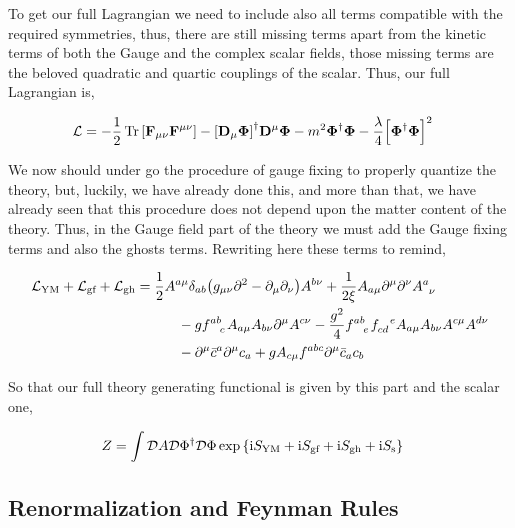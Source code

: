 To get our full Lagrangian we need to include also all terms compatible with the required symmetries, 
thus, there are still missing terms apart from the kinetic terms of both the Gauge and the complex scalar 
fields, those missing terms are the beloved quadratic and quartic couplings of the scalar. Thus,
our full Lagrangian is,

\begin{align}
    \mathcal L&=-\frac12\Tr\qty[\vb F_{\mu\nu}\vb F^{\mu\nu}]-\qty[\vb D_\mu\boldsymbol\Phi]^\dagger
    \vb D^\mu\boldsymbol\Phi-m^2\boldsymbol\Phi^\dagger\boldsymbol\Phi-\frac{\lambda}{4}\qty[\boldsymbol\Phi^\dagger\boldsymbol\Phi]^2\nonumber
\end{align}

We now should under go the procedure of gauge fixing to properly quantize the theory, but, luckily, 
we have already done this, and more than that, we have already seen that this procedure does not depend 
upon the matter content of the theory. Thus, in the Gauge field part of the theory we must add the 
Gauge fixing terms and also the ghosts terms. Rewriting here these terms to remind,

\begin{align}
    {\mathcal L}_{\textnormal{YM}}+{\mathcal L}_{\textnormal{gf}}+{\mathcal L}_{\textnormal{gh}}&=\frac12A^{a\mu}\delta_{ab}\qty(g_{\mu\nu}\partial^2 -\partial_\mu\partial_\nu )A^{b\nu}+\frac{1}{2\xi} A_{a\mu}\partial^\mu\partial^\nu \tensor{A}{^a_\nu}\nonumber\\
    &\quad\quad\quad-g\tensor{f}{^a^b_c}A_{a\mu}A_{b\nu}\partial^\mu A^{c\nu}-\frac{g^2}{4}\tensor{f}{^a^b_e}\tensor{f}{_c_d^e}A_{a\mu}A_{b\nu}A^{c\mu}A^{d\nu}\nonumber\\
    &\quad\quad\quad -\partial^\mu\bar c^a\partial^\mu c_a+g A_{c\mu}\tensor{f}{^a^b^c}\partial^\mu \bar c_ac_b\nonumber
\end{align}

So that our full theory generating functional is given by this part and the scalar one,

\begin{align}
    Z&=\int\mathcal D A\mathcal D \Phi^\dagger\mathcal D \Phi\exp\qty{\textnormal{i}S_{\textnormal{YM}}+\textnormal{i}S_{\textnormal{gf}}+\textnormal{i}S_{\textnormal{gh}}+\textnormal{i}S_{\textnormal{s}}}\nonumber
\end{align}

\subsection{Renormalization and Feynman Rules}

